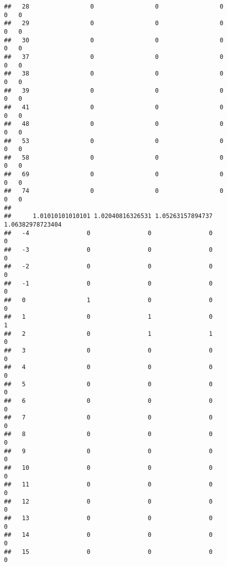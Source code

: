 \documentclass[]{article}
\begin{document}
\begin{verbatim}
##   28                 0                 0                 0                0   0
##   29                 0                 0                 0                0   0
##   30                 0                 0                 0                0   0
##   37                 0                 0                 0                0   0
##   38                 0                 0                 0                0   0
##   39                 0                 0                 0                0   0
##   41                 0                 0                 0                0   0
##   48                 0                 0                 0                0   0
##   53                 0                 0                 0                0   0
##   58                 0                 0                 0                0   0
##   69                 0                 0                 0                0   0
##   74                 0                 0                 0                0   0
##     
##      1.01010101010101 1.02040816326531 1.05263157894737 1.06382978723404
##   -4                0                0                0                0
##   -3                0                0                0                0
##   -2                0                0                0                0
##   -1                0                0                0                0
##   0                 1                0                0                0
##   1                 0                1                0                1
##   2                 0                1                1                0
##   3                 0                0                0                0
##   4                 0                0                0                0
##   5                 0                0                0                0
##   6                 0                0                0                0
##   7                 0                0                0                0
##   8                 0                0                0                0
##   9                 0                0                0                0
##   10                0                0                0                0
##   11                0                0                0                0
##   12                0                0                0                0
##   13                0                0                0                0
##   14                0                0                0                0
##   15                0                0                0                0

\end{verbatim}
\end{document}
